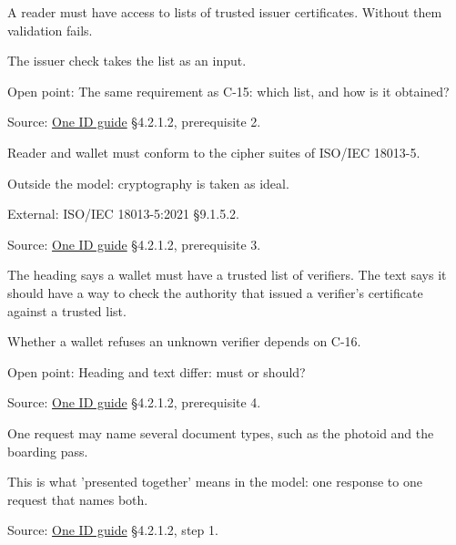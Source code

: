 \begin{definition}
  \label{def:c49}
  \notready
  A reader must have access to lists of trusted issuer certificates. Without
  them validation fails.

  The issuer check takes the list as an input.

  Open point: The same requirement as C-15: which list, and how is it
  obtained?

  Source:
  \href{https://standards.atlassian.net/wiki/spaces/OneID/pages/2947416082/Technical+Implementation+Guide}{One
  ID guide} §4.2.1.2, prerequisite 2.
\end{definition}

\begin{definition}
  \label{def:c50}
  Reader and wallet must conform to the cipher suites of ISO/IEC 18013-5.

  Outside the model: cryptography is taken as ideal.

  External: ISO/IEC 18013-5:2021 §9.1.5.2.

  Source:
  \href{https://standards.atlassian.net/wiki/spaces/OneID/pages/2947416082/Technical+Implementation+Guide}{One
  ID guide} §4.2.1.2, prerequisite 3.
\end{definition}

\begin{definition}
  \label{def:c51}
  \notready
  The heading says a wallet must have a trusted list of verifiers. The text
  says it should have a way to check the authority that issued a verifier's
  certificate against a trusted list.

  Whether a wallet refuses an unknown verifier depends on C-16.

  Open point: Heading and text differ: must or should?

  Source:
  \href{https://standards.atlassian.net/wiki/spaces/OneID/pages/2947416082/Technical+Implementation+Guide}{One
  ID guide} §4.2.1.2, prerequisite 4.
\end{definition}

\begin{definition}
  \label{def:c53}
  One request may name several document types, such as the photoid and the
  boarding pass.

  This is what 'presented together' means in the model: one response to one
  request that names both.

  Source:
  \href{https://standards.atlassian.net/wiki/spaces/OneID/pages/2947416082/Technical+Implementation+Guide}{One
  ID guide} §4.2.1.2, step 1.
\end{definition}

